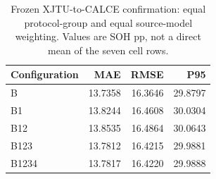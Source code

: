 \begin{table}[!htbp]
\centering
\caption{Frozen XJTU-to-CALCE confirmation: equal protocol-group and equal source-model weighting. Values are SOH pp, not a direct mean of the seven cell rows.}
\label{tab:externaloverall}
\footnotesize
\setlength{\tabcolsep}{4pt}
\begin{tabular}{lrrr}
\toprule
Configuration & MAE & RMSE & P95 \\
\midrule
B & 13.7358 & 16.3646 & 29.8797 \\
B1 & 13.8244 & 16.4608 & 30.0304 \\
B12 & 13.8535 & 16.4864 & 30.0643 \\
B123 & 13.7812 & 16.4215 & 29.9881 \\
B1234 & 13.7817 & 16.4220 & 29.9888 \\
\bottomrule
\end{tabular}
\end{table}

